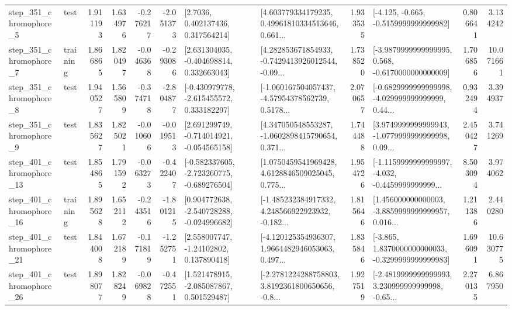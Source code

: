 \begin{tabular}{llrrrrllrlrr}
   step\_351\_chromophore\_5 &      test &      1.911193 &    1.634976 &     -0.276217 & -2.051373 &          [2.7036, 0.402137436, 0.317564214] &  [4.603779334179235, 0.49961810334513646, 0.661... &       1.933535 &              [-4.125, -0.665, -0.5159999999999982] &            0.806641 &          3.134242 \\
   step\_351\_chromophore\_7 &  training &      1.866865 &    1.820497 &     -0.046368 & -0.293086 &    [2.631304035, -0.404698814, 0.332663043] &  [4.282853671854933, -0.7429413926012544, -0.09... &       1.738520 &  [-3.9879999999999995, 0.568, -0.6170000000000009] &            1.706856 &         10.071661 \\
   step\_351\_chromophore\_8 &      test &      1.940527 &    1.565809 &     -0.374718 & -2.804877 &   [-0.430979778, -2.615455572, 0.333182297] &  [-1.060167504057437, -4.57954378562739, 0.5178... &       2.070657 &  [-0.6829999999999998, -4.029999999999999, 0.44... &            0.932494 &          3.394937 \\
   step\_351\_chromophore\_9 &      test &      1.835627 &    1.825021 &     -0.010606 & -0.019513 &   [2.691299749, -0.714014921, -0.054565158] &  [4.347050548553287, -1.0602898415790654, 0.371... &       1.744488 &  [3.9749999999999943, -1.0779999999999998, 0.09... &            2.450427 &          3.741269 \\
  step\_401\_chromophore\_13 &      test &      1.854865 &    1.791592 &     -0.063273 & -0.422407 &  [-0.582337605, -2.723260775, -0.689276504] &  [1.0750459541969428, 4.6128846509025045, 0.775... &       1.954726 &  [-1.1159999999999997, -4.032, -0.4459999999999... &            8.503094 &          3.974062 \\
  step\_401\_chromophore\_16 &  training &      1.895628 &    1.652112 &     -0.243516 & -1.801215 &   [0.904772638, -2.540728288, -0.024996682] &  [-1.485232384917332, 4.248566922923932, -0.182... &       1.815646 &  [1.456000000000003, -3.8859999999999957, 0.016... &            1.211386 &          2.440280 \\
  step\_401\_chromophore\_21 &      test &      1.844008 &    1.672189 &     -0.171819 & -1.252751 &     [2.558007747, -1.24102802, 0.137890418] &  [-4.120125354936307, 1.9664482946053063, 0.497... &       1.835846 &  [-3.865, 1.8370000000000033, -0.3299999999999983] &            1.696091 &         10.630775 \\
  step\_401\_chromophore\_26 &      test &      1.898077 &    1.828249 &     -0.069828 & -0.472551 &    [1.521478915, -2.085087867, 0.501529487] &  [-2.2781224288758803, 3.8192361800650656, -0.8... &       1.927519 &  [-2.4819999999999993, 3.230999999999998, -0.65... &            2.270135 &          6.867950 \\

\end{tabular}
